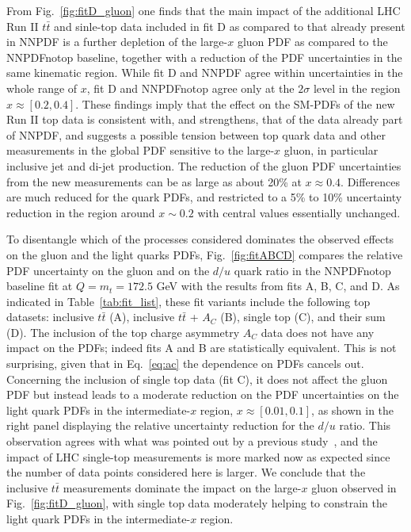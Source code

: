 \documentclass[withindex,glossary]{cam-thesis}
\begin{document}
%
From Fig.~\ref{fig:fitD_gluon} one finds that the main impact of the
additional LHC Run II $t\bar{t}$ and sinle-top data included in fit D as compared to that
already present in NNPDF is a further depletion of the large-$x$ gluon
PDF as compared to the NNPDFnotop baseline, together with a reduction of
the PDF uncertainties in the same kinematic region.
%
While fit D and NNPDF agree within uncertainties in the whole range of $x$,
fit D and NNPDFnotop agree only at the $2\sigma$ level
in the region $x\approx [0.2,0.4]$.
%
These findings imply that the effect on the SM-PDFs of the new Run II top
data is consistent with, and strengthens, that of the data already part of
NNPDF, and suggests a possible tension
between top quark data and other measurements in the global PDF sensitive
to the large-$x$ gluon, in particular inclusive jet and di-jet production.
%
The reduction of the gluon PDF uncertainties from the new measurements
can be as large as about 20\% at $x\approx 0.4$.
%
Differences are much reduced for the quark PDFs, and restricted
to a 5\% to 10\% uncertainty reduction in the region around $x\sim 0.2$
with central values essentially unchanged.

To disentangle which of the processes
considered dominates the observed effects on the gluon and the light
quarks PDFs, Fig.~\ref{fig:fitABCD} compares the relative PDF uncertainty
on the gluon and on the $d/u$ quark ratio in the NNPDFnotop 
baseline fit at $Q=m_t=172.5$ GeV with the results from fits A, B, C, and D.
%
As indicated in Table~\ref{tab:fit_list}, these fit variants include the following top datasets:  inclusive $t\bar{t}$ (A),
inclusive $t\bar{t}$ + $A_C$ (B), single top (C), and their sum (D).
%
The inclusion of the top charge asymmetry $A_C$ data does not have any
impact on the PDFs; indeed fits A and B are statistically equivalent.
%
This is not surprising, given that in  Eq.~\eqref{eq:ac} the dependence
on PDFs cancels out.
%
Concerning the inclusion of single top data (fit C), it does not affect
the gluon PDF but instead leads to a moderate reduction on the PDF
uncertainties on the light quark PDFs in the intermediate-$x$ region,
$x\approx[0.01,0.1]$, as shown in the right panel
displaying the relative uncertainty reduction for the $d/u$ ratio.
%
This observation agrees with what was pointed out by a previous
study~\cite{Nocera:2019wyk}, and the impact of  LHC single-top
measurements is more marked now
as expected since the number of data points considered here is larger.
%
We conclude that the inclusive $t\bar{t}$ measurements dominate
the impact on the large-$x$ gluon observed in Fig.~\ref{fig:fitD_gluon}, with
single top data moderately helping to constrain the light quark PDFs
in the intermediate-$x$ region. 
\end{document}
